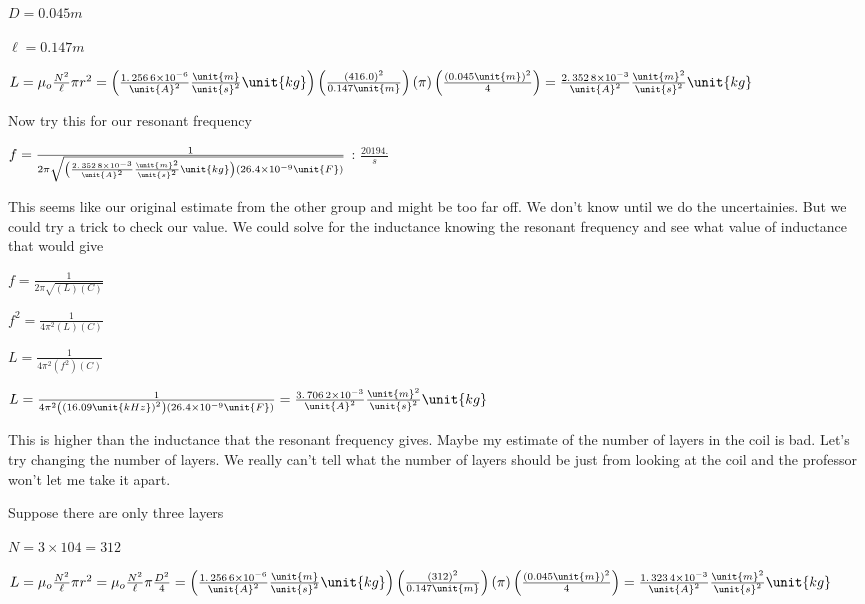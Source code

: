 \documentclass{sebase}
\begin{document}
$D=0.045\unit{m}$

$\ell =0.147\unit{m}$

$L=\mu _{o}\frac{N^{2}}{\ell }\pi r^{2}=\left( \allowbreak \frac{%
1.\,\allowbreak 256\,6\times 10^{-6}}{\unit{A}^{2}}\frac{\unit{m}}{\unit{s}%
^{2}}\unit{kg}\right) \left( \frac{\left( \allowbreak 416.0\right) ^{2}}{%
0.147\unit{m}}\right) \left( \pi \right) \left( \frac{\left( 0.045\unit{m}%
\right) ^{2}}{4}\right) =\allowbreak \frac{2.\,\allowbreak 352\,8\times
10^{-3}}{\unit{A}^{2}}\frac{\unit{m}^{2}}{\unit{s}^{2}}\unit{kg}$

Now try this for our resonant frequency 

\bigskip $f=\frac{1}{2\pi \sqrt{\left( \allowbreak \frac{2.\,\allowbreak
352\,8\times 10^{-3}}{\unit{A}^{2}}\frac{\unit{m}^{2}}{\unit{s}^{2}}\unit{kg}%
\right) \left( 26.4\times 10^{-9}\unit{F}\right) }}\bigskip $ : $\frac{20194.%
}{\unit{s}}$ 

This seems like our original estimate from the other group and might be too
far off. We don't know until we do the uncertainies. But we could try a
trick to check our value. We could solve for the inductance knowing the
resonant frequency and see what value of inductance that would give

$f=\frac{1}{2\pi \sqrt{\left( L\right) \left( C\right) }}$

$f^{2}=\frac{1}{4\pi ^{2}\left( L\right) \left( C\right) }$

$L=\frac{1}{4\pi ^{2}\left( f^{2}\right) \left( C\right) }$

\bigskip $L=\frac{1}{4\pi ^{2}\left( \left( 16.09\unit{kHz}\right)
^{2}\right) \left( 26.4\times 10^{-9}\unit{F}\right) }=\allowbreak \frac{%
3.\,\allowbreak 706\,2\times 10^{-3}}{\unit{A}^{2}}\frac{\unit{m}^{2}}{\unit{%
s}^{2}}\unit{kg}$

This is higher than the inductance that the resonant frequency gives. Maybe
my estimate of the number of layers in the coil is bad. Let's try changing
the number of layers. We really can't tell what the number of layers should
be just from looking at the coil and the professor won't let me take it
apart. 

Suppose there are only three layers

$N=3\times 104=\allowbreak 312$

$L=\mu _{o}\frac{N^{2}}{\ell }\pi r^{2}=\mu _{o}\frac{N^{2}}{\ell }\pi \frac{%
D^{2}}{4}=\left( \allowbreak \frac{1.\,\allowbreak 256\,6\times 10^{-6}}{%
\unit{A}^{2}}\frac{\unit{m}}{\unit{s}^{2}}\unit{kg}\right) \left( \frac{%
\left( 312\right) ^{2}}{0.147\unit{m}}\right) \left( \pi \right) \left( 
\frac{\left( 0.045\unit{m}\right) ^{2}}{4}\right) =\allowbreak \frac{%
1.\,\allowbreak 323\,4\times 10^{-3}}{\unit{A}^{2}}\frac{\unit{m}^{2}}{\unit{%
s}^{2}}\unit{kg}$
\end{document}
